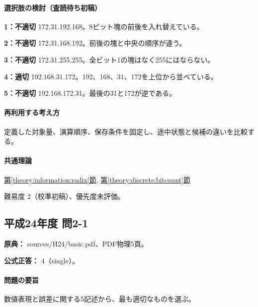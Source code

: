 \paragraph{選択肢の検討（査読待ち初稿）}\mbox{}\par

\noindent\textbf{1：不適切} 172.31.192.168。8ビット塊の前後を入れ替えている。\par

\noindent\textbf{2：不適切} 172.31.168.192。前後の塊と中央の順序が違う。\par

\noindent\textbf{3：不適切} 172.31.255.255。全ビット1の塊はなく255にはならない。\par

\noindent\textbf{4：適切} 192.168.31.172。192、168、31、172を上位から並べている。\par

\noindent\textbf{5：不適切} 192.168.172.31。最後の31と172が逆である。\par

\paragraph{再利用する考え方} 定義した対象量、演算順序、保存条件を固定し、途中状態と候補の違いを比較する。

\paragraph{共通理論} \hyperref[theory:information:radix]{第\ref*{theory:information:radix}節}, \hyperref[theory:discrete:bitcount]{第\ref*{theory:discrete:bitcount}節}

\par 難易度 2（校準初稿）、優先度未評価。

\subsection{平成24年度 問2-1}
\label{q:h24-reg-basic-2-1}

\noindent\textbf{原典：} sources/H24/basic.pdf、PDF物理5頁。

\textbf{公式正答：} 4（single）。

\paragraph{問題の要旨} 数値表現と誤差に関する5記述から、最も適切なものを選ぶ。

